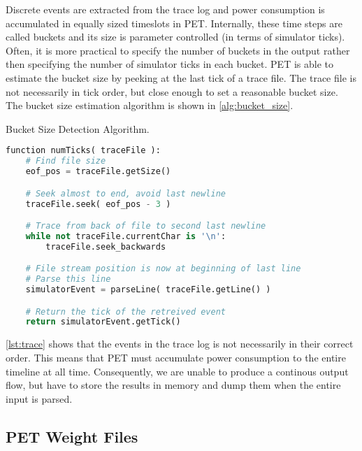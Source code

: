 Discrete events are extracted from the trace log and power consumption is
accumulated in equally sized timeslots in PET. Internally, these time steps are
called buckets and its size is parameter controlled (in terms of simulator
ticks). Often, it is more practical to specify the number of buckets in the
output rather then specifying the number of simulator ticks in each bucket.
PET is able to estimate the bucket size by peeking at the last tick of a trace
file. The trace file is not necessarily in tick order, but close enough to set
a reasonable bucket size. The bucket size estimation algorithm is shown in
\autoref{alg:bucket_size}.

\begin{algorithm}[htb]
    \caption{Bucket Size Detection Algorithm.}
    \label{alg:bucket_size}
    \begin{lstlisting}[language=Python,style=algo]
function numTicks( traceFile ):
    # Find file size
    eof_pos = traceFile.getSize()

    # Seek almost to end, avoid last newline
    traceFile.seek( eof_pos - 3 )

    # Trace from back of file to second last newline
    while not traceFile.currentChar is '\n':
        traceFile.seek_backwards

    # File stream position is now at beginning of last line
    # Parse this line
    simulatorEvent = parseLine( traceFile.getLine() )

    # Return the tick of the retreived event
    return simulatorEvent.getTick()
    \end{lstlisting}
\end{algorithm}

\autoref{lst:trace} shows that the events in the trace log is not necessarily in
their correct order. This means that PET must accumulate power consumption to the
entire timeline at all time. Consequently, we are unable to produce a continous
output flow, but have to store the results in memory and dump them when the
entire input is parsed.


\subsection{PET Weight Files}

